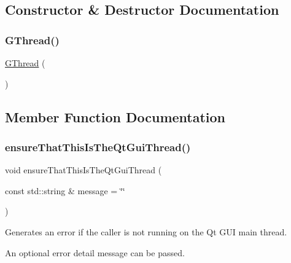 \subsection{Constructor \& Destructor Documentation}
\mbox{\label{classGThread_a7db4904140090c18f864e09283f2b529}} 
\subsubsection{\texorpdfstring{G\+Thread()}{GThread()}}
{\footnotesize\ttfamily \mbox{\hyperlink{classGThread}{G\+Thread}} (\begin{DoxyParamCaption}{ }\end{DoxyParamCaption})\hspace{0.3cm}{\ttfamily [protected]}}



\subsection{Member Function Documentation}
\mbox{\label{classGThread_a27a1f5f9657637e4a4b6a7127ca9da33}} 
\subsubsection{\texorpdfstring{ensure\+That\+This\+Is\+The\+Qt\+Gui\+Thread()}{ensureThatThisIsTheQtGuiThread()}}
{\footnotesize\ttfamily void ensure\+That\+This\+Is\+The\+Qt\+Gui\+Thread (\begin{DoxyParamCaption}\item[{const std\+::string \&}]{message = {\ttfamily \char`\"{}\char`\"{}} }\end{DoxyParamCaption})\hspace{0.3cm}{\ttfamily [static]}}



Generates an error if the caller is not running on the Qt G\+UI main thread. 

An optional error detail message can be passed. \mbox{\label{classGThread_a7bf03645e8eb0dd26b54b4e48b5206e1}} 
